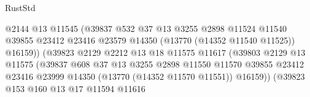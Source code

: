 \begin{lexlean}{RustStd}
\begin{coremodule}
                                          @2144
                                          @13
                                          @11545
                                          (@39837
                                            @532
                                            @37
                                            @13
                                            @3255
                                            @2898
                                            @11524
                                            @11540
                                            @39855
                                            @23412
                                            @23416
                                            @23579
                                            @14350
                                            (@13770 (@14352 @11540 @11525))
                                            @16159))
                                        (@39823
                                          @2129
                                          @2212
                                          @13
                                          @18
                                          @11575
                                          @11617
                                          (@39803
                                            @2129
                                            @13
                                            @11575
                                            (@39837
                                              @608
                                              @37
                                              @13
                                              @3255
                                              @2898
                                              @11550
                                              @11570
                                              @39855
                                              @23412
                                              @23416
                                              @23999
                                              @14350
                                              (@13770 (@14352 @11570 @11551))
                                              @16159))
                                          (@39823
                                            @153
                                            @160
                                            @13
                                            @17
                                            @11594
                                            @11616

\end{coremodule}
\end{lexlean}
